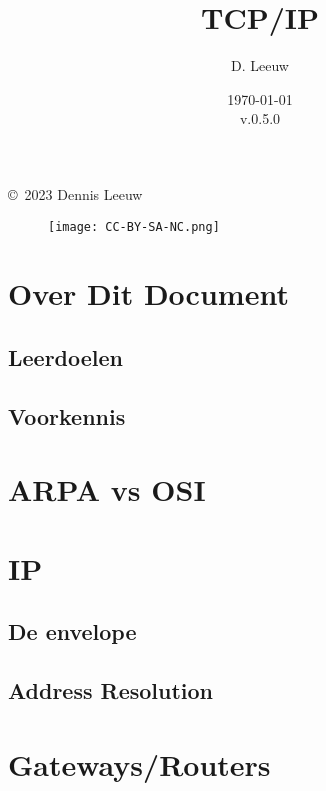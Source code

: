 \documentclass[a4paper,12pt,twoside,openright,titlepage]{book}
\author{D. Leeuw}
\title{TCP/IP}
\date{\today\\v.0.5.0}
\begin{document}

\maketitle

\copyright\ 2023 Dennis Leeuw\\

\begin{figure}[H]
\texttt{[image: CC-BY-SA-NC.png]}
\end{figure}

\bigskip




\frontmatter
\chapter{Over Dit Document}
%
%
\section{Leerdoelen}

\section{Voorkennis}


\tableofcontents

\mainmatter

\chapter{ARPA vs OSI}



\chapter{IP}

\section{De envelope}

\section{Address Resolution}


\chapter{Gateways/Routers}

\end{document}
